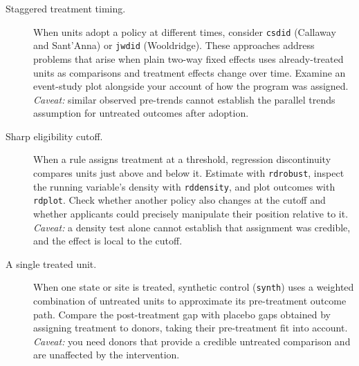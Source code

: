 \begin{description}
    \item[Staggered treatment timing.] When units adopt a policy at different times, consider \texttt{csdid} (Callaway and Sant'Anna) or \texttt{jwdid} (Wooldridge). These approaches address problems that arise when plain two-way fixed effects uses already-treated units as comparisons and treatment effects change over time. Examine an event-study plot alongside your account of how the program was assigned. \emph{Caveat:} similar observed pre-trends cannot establish the parallel trends assumption for untreated outcomes after adoption.
    \item[Sharp eligibility cutoff.] When a rule assigns treatment at a threshold, regression discontinuity compares units just above and below it. Estimate with \texttt{rdrobust}, inspect the running variable's density with \texttt{rddensity}, and plot outcomes with \texttt{rdplot}. Check whether another policy also changes at the cutoff and whether applicants could precisely manipulate their position relative to it. \emph{Caveat:} a density test alone cannot establish that assignment was credible, and the effect is local to the cutoff.
    \item[A single treated unit.] When one state or site is treated, synthetic control (\texttt{synth}) uses a weighted combination of untreated units to approximate its pre-treatment outcome path. Compare the post-treatment gap with placebo gaps obtained by assigning treatment to donors, taking their pre-treatment fit into account. \emph{Caveat:} you need donors that provide a credible untreated comparison and are unaffected by the intervention.

\end{description}
